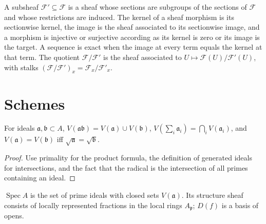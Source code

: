 \begin{definition}
\label{def:II-1-subsheaf-exact}
A subsheaf $\mathcal F'\subseteq\mathcal F$ is a sheaf whose sections are subgroups of the
sections of $\mathcal F$ and whose restrictions are induced.  The kernel of a sheaf morphism is its
sectionwise kernel, the image is the sheaf associated to its sectionwise image, and a morphism is
injective or surjective according as its kernel is zero or its image is the target.  A sequence is
exact when the image at every term equals the kernel at that term.  The quotient $\mathcal F/\mathcal F'$
is the sheaf associated to $U\mapsto\mathcal F(U)/\mathcal F'(U)$, with stalks
$(\mathcal F/\mathcal F')_x=\mathcal F_x/\mathcal F'_x$.
\end{definition}

\section{Schemes}

\begin{lemma}
\label{lem:II-2-1}
\leanok
For ideals $\mathfrak a,\mathfrak b\subset A$,
$V(\mathfrak a\mathfrak b)=V(\mathfrak a)\cup V(\mathfrak b)$,
$V(\sum_i\mathfrak a_i)=\bigcap_iV(\mathfrak a_i)$, and
$V(\mathfrak a)=V(\mathfrak b)$ iff $\sqrt{\mathfrak a}=\sqrt{\mathfrak b}$.
\end{lemma}
\begin{proof}
Use primality for the product formula, the definition of generated ideals for intersections, and
the fact that the radical is the intersection of all primes containing an ideal.
\end{proof}

\begin{definition}
\label{def:II-2-spectrum}
 $\operatorname{Spec}A$ is the set of prime ideals with closed sets $V(\mathfrak a)$. Its structure
sheaf consists of locally represented fractions in the local rings $A_{\mathfrak p}$; $D(f)$ is a
basis of opens.
\end{definition}

